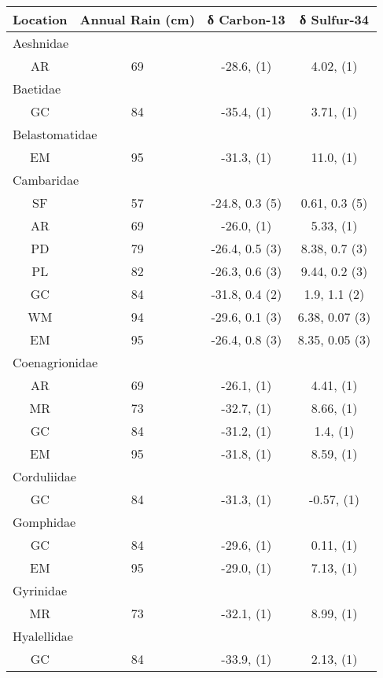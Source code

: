 \documentclass[
]{article}
\begin{document}
\begin{longtable}{cccc}
\toprule
Location & Annual Rain (cm) & δ Carbon-13 & δ Sulfur-34 \\ 
\midrule
\multicolumn{4}{l}{Aeshnidae} \\ 
\midrule
AR & 69 & -28.6,     (1) & 4.02,     (1) \\ 
\midrule
\multicolumn{4}{l}{Baetidae} \\ 
\midrule
GC & 84 & -35.4,     (1) & 3.71,     (1) \\ 
\midrule
\multicolumn{4}{l}{Belastomatidae} \\ 
\midrule
EM & 95 & -31.3,     (1) & 11.0,     (1) \\ 
\midrule
\multicolumn{4}{l}{Cambaridae} \\ 
\midrule
SF & 57 & -24.8, 0.3 (5) & 0.61, 0.3 (5) \\ 
AR & 69 & -26.0,     (1) & 5.33,     (1) \\ 
PD & 79 & -26.4, 0.5 (3) & 8.38, 0.7 (3) \\ 
PL & 82 & -26.3, 0.6 (3) & 9.44, 0.2 (3) \\ 
GC & 84 & -31.8, 0.4 (2) & 1.9, 1.1 (2) \\ 
WM & 94 & -29.6, 0.1 (3) & 6.38, 0.07 (3) \\ 
EM & 95 & -26.4, 0.8 (3) & 8.35, 0.05 (3) \\ 
\midrule
\multicolumn{4}{l}{Coenagrionidae} \\ 
\midrule
AR & 69 & -26.1,     (1) & 4.41,     (1) \\ 
MR & 73 & -32.7,     (1) & 8.66,     (1) \\ 
GC & 84 & -31.2,     (1) & 1.4,     (1) \\ 
EM & 95 & -31.8,     (1) & 8.59,     (1) \\ 
\midrule
\multicolumn{4}{l}{Corduliidae} \\ 
\midrule
GC & 84 & -31.3,     (1) & -0.57,     (1) \\ 
\midrule
\multicolumn{4}{l}{Gomphidae} \\ 
\midrule
GC & 84 & -29.6,     (1) & 0.11,     (1) \\ 
EM & 95 & -29.0,     (1) & 7.13,     (1) \\ 
\midrule
\multicolumn{4}{l}{Gyrinidae} \\ 
\midrule
MR & 73 & -32.1,     (1) & 8.99,     (1) \\ 
\midrule
\multicolumn{4}{l}{Hyalellidae} \\ 
\midrule
GC & 84 & -33.9,     (1) & 2.13,     (1) \\ 

\end{longtable}
\end{document}
